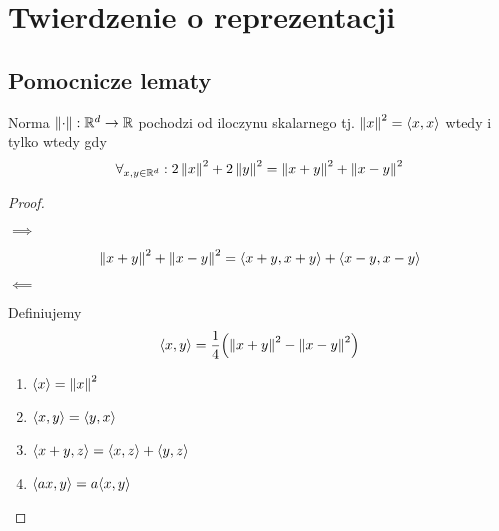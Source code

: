 \section{Twierdzenie o reprezentacji}
\subsection{Pomocnicze lematy}
\begin{lemma}
	Norma \( \left\Vert \cdot \right\Vert : \mathbb{R}^d \rightarrow \mathbb{R} \) pochodzi od iloczynu skalarnego tj. \( \left\Vert x \right\Vert^2 = \left\langle x, x\right\rangle \) wtedy i tylko wtedy gdy
	\[
		\forall_{x, y \in \mathbb{R}^d} : 2\left\Vert x \right\Vert^2  + 2\left\Vert y \right\Vert^2 = \left\Vert x + y \right\Vert^2 + \left\Vert x - y \right\Vert^2
	\]
\end{lemma}

\begin{proof} \( \)
	\begin{description}
		\item \( \implies \)

		      \[
			      \left\Vert x + y \right\Vert^2 + \left\Vert x - y \right\Vert^2
			      = \left\langle x + y, x + y\right\rangle
			      + \left\langle x - y, x - y\right\rangle
		      \]

		\item \( \impliedby \)

		      Definiujemy \[
			      \dotproduct{x, y} = \frac{1}{4} \pars{\norm{x + y}^2 - \norm{x - y}^2}
		      \]

		      \begin{enumerate}
			      \item \( \left\langle x\right\rangle = \left\Vert x \right\Vert^2 \)
			      \item \( \left\langle x, y\right\rangle = \left\langle y, x\right\rangle \)
			      \item \( \left\langle x + y, z\right\rangle = \left\langle x, z\right\rangle + \left\langle y, z\right\rangle \)
			      \item \( \dotproduct{ax, y} = a\dotproduct{x, y} \)
		      \end{enumerate}

	\end{description}
\end{proof}

